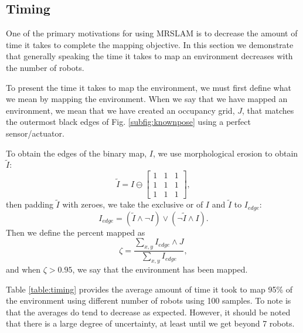 \subsection{Timing}
\label{S:Exp:Timing}

One of the primary motivations for using MRSLAM is to decrease the amount of time it takes to complete the mapping objective.  In this section we demonstrate that generally speaking the time it takes to map an environment decreases with the number of robots.  

To present the time it takes to map the environment, we must first define what we mean by mapping the environment.  When we say that we have mapped an environment, we mean that we have created an occupancy grid, $J$, that matches the outermost black edges of Fig. \ref{subfig:knownpose} using a perfect sensor/actuator.  

To obtain the edges of the binary map, $I$, we use morphological erosion to obtain $\tilde{I}$:
\begin{equation}
\tilde{I}=I\ominus \begin{bmatrix}
1 & 1 & 1 \\
1 & 1 & 1 \\
1 & 1 & 1
\end{bmatrix},
\end{equation}
then padding $\tilde{I}$ with zeroes, we take the exclusive or of $I$ and $\tilde{I}$ to $I_{edge}$:
\begin{equation}
I_{edge}=(\tilde{I}\wedge \neg I)\vee (\neg \tilde{I}\wedge I).
\end{equation}
Then we define the percent mapped as
\begin{equation}
\zeta =\frac{\sum_{x,y}I_{edge}\wedge J}{\sum_{x,y}I_{edge}},
\end{equation}
and when $\zeta>0.95$, we say that the environment has been mapped.

Table \ref{table:timing} provides the average amount of time it took to map 95\% of the environment using different number of robots using 100 samples.  To note is that the averages do tend to decrease as expected.  However, it should be noted that there is a large degree of uncertainty, at least until we get beyond 7 robots.  

